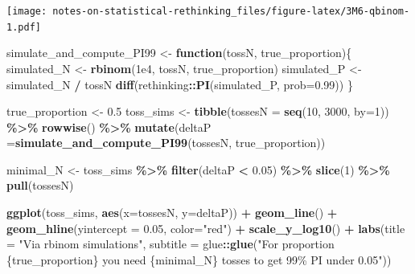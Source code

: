 \documentclass[
]{book}
\newenvironment{Shaded}{\begin{snugshade}}{\end{snugshade}}
\newcommand{\ControlFlowTok}[1]{\textcolor[rgb]{0.13,0.29,0.53}{\textbf{#1}}}
\newcommand{\DataTypeTok}[1]{\textcolor[rgb]{0.13,0.29,0.53}{#1}}
\newcommand{\DecValTok}[1]{\textcolor[rgb]{0.00,0.00,0.81}{#1}}
\newcommand{\FloatTok}[1]{\textcolor[rgb]{0.00,0.00,0.81}{#1}}
\newcommand{\KeywordTok}[1]{\textcolor[rgb]{0.13,0.29,0.53}{\textbf{#1}}}
\newcommand{\NormalTok}[1]{#1}
\newcommand{\OperatorTok}[1]{\textcolor[rgb]{0.81,0.36,0.00}{\textbf{#1}}}
\newcommand{\StringTok}[1]{\textcolor[rgb]{0.31,0.60,0.02}{#1}}
\begin{document}
\texttt{[image: notes-on-statistical-rethinking\_files/figure-latex/3M6-qbinom-1.pdf]}

\begin{Shaded}
\begin{Highlighting}[]
\NormalTok{simulate\_and\_compute\_PI99 \textless{}{-}}\StringTok{ }\ControlFlowTok{function}\NormalTok{(tossN, true\_proportion)\{}
\NormalTok{  simulated\_N \textless{}{-}}\StringTok{ }\KeywordTok{rbinom}\NormalTok{(}\FloatTok{1e4}\NormalTok{, tossN, true\_proportion)}
\NormalTok{  simulated\_P \textless{}{-}}\StringTok{ }\NormalTok{simulated\_N }\OperatorTok{/}\StringTok{ }\NormalTok{tossN}
  \KeywordTok{diff}\NormalTok{(rethinking}\OperatorTok{::}\KeywordTok{PI}\NormalTok{(simulated\_P, }\DataTypeTok{prob=}\FloatTok{0.99}\NormalTok{))}
\NormalTok{\}}

\NormalTok{true\_proportion \textless{}{-}}\StringTok{ }\FloatTok{0.5}
\NormalTok{toss\_sims \textless{}{-}}\StringTok{ }
\StringTok{  }\KeywordTok{tibble}\NormalTok{(}\DataTypeTok{tossesN =} \KeywordTok{seq}\NormalTok{(}\DecValTok{10}\NormalTok{, }\DecValTok{3000}\NormalTok{, }\DataTypeTok{by=}\DecValTok{1}\NormalTok{)) }\OperatorTok{\%\textgreater{}\%}
\StringTok{  }\KeywordTok{rowwise}\NormalTok{() }\OperatorTok{\%\textgreater{}\%}
\StringTok{  }\KeywordTok{mutate}\NormalTok{(}\DataTypeTok{deltaP =}\KeywordTok{simulate\_and\_compute\_PI99}\NormalTok{(tossesN, true\_proportion))}

\NormalTok{minimal\_N \textless{}{-}}\StringTok{ }
\StringTok{  }\NormalTok{toss\_sims }\OperatorTok{\%\textgreater{}\%}
\StringTok{  }\KeywordTok{filter}\NormalTok{(deltaP }\OperatorTok{\textless{}}\StringTok{ }\FloatTok{0.05}\NormalTok{) }\OperatorTok{\%\textgreater{}\%}
\StringTok{  }\KeywordTok{slice}\NormalTok{(}\DecValTok{1}\NormalTok{) }\OperatorTok{\%\textgreater{}\%}
\StringTok{  }\KeywordTok{pull}\NormalTok{(tossesN)}

\KeywordTok{ggplot}\NormalTok{(toss\_sims, }\KeywordTok{aes}\NormalTok{(}\DataTypeTok{x=}\NormalTok{tossesN, }\DataTypeTok{y=}\NormalTok{deltaP)) }\OperatorTok{+}\StringTok{ }
\StringTok{  }\KeywordTok{geom\_line}\NormalTok{() }\OperatorTok{+}\StringTok{ }
\StringTok{  }\KeywordTok{geom\_hline}\NormalTok{(}\DataTypeTok{yintercept =} \FloatTok{0.05}\NormalTok{, }\DataTypeTok{color=}\StringTok{"red"}\NormalTok{) }\OperatorTok{+}\StringTok{ }
\StringTok{  }\KeywordTok{scale\_y\_log10}\NormalTok{() }\OperatorTok{+}\StringTok{ }
\StringTok{  }\KeywordTok{labs}\NormalTok{(}\DataTypeTok{title =} \StringTok{"Via rbinom simulations"}\NormalTok{,}
       \DataTypeTok{subtitle =}\NormalTok{ glue}\OperatorTok{::}\KeywordTok{glue}\NormalTok{(}\StringTok{"For proportion \{true\_proportion\} you need \{minimal\_N\} tosses to get 99\% PI under 0.05"}\NormalTok{))}
\end{Highlighting}
\end{Shaded}
\end{document}
